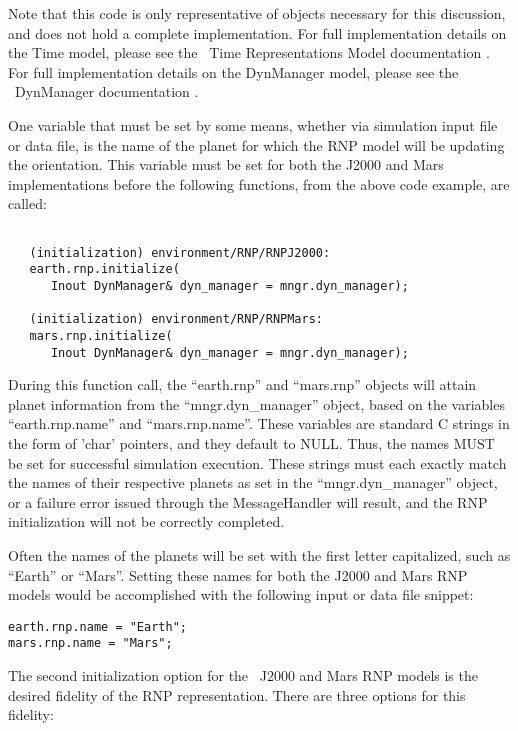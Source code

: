 Note that this code is only representative of objects necessary
for this discussion, and does not hold a complete implementation.
For full implementation details on the Time model, please see
the \JEODid\ Time Representations Model documentation \cite{dynenv:TIME}.
For full implementation details on the DynManager model,
please see the \JEODid\ DynManager documentation
\cite{dynenv:DYNMANAGER}.

One variable that must be set by some means, whether via simulation input
file or data file, is the name of the planet for which the RNP model will be
updating the orientation. This variable must be set for both the J2000 and Mars
implementations before the following functions, from the above code example,
are called:

\begin{verbatim}

   (initialization) environment/RNP/RNPJ2000:
   earth.rnp.initialize(
      Inout DynManager& dyn_manager = mngr.dyn_manager);

   (initialization) environment/RNP/RNPMars:
   mars.rnp.initialize(
      Inout DynManager& dyn_manager = mngr.dyn_manager);

\end{verbatim}

During this function call, the ``earth.rnp'' and ``mars.rnp'' objects will
attain planet information from the \newline ``mngr.dyn\_manager'' object, based
on the variables ``earth.rnp.name'' and ``mars.rnp.name''. These variables are
standard C strings in the form of 'char' pointers, and they default to NULL.
Thus, the names MUST be set for successful simulation execution. These strings
must each exactly match the names of their respective planets as set in the
``mngr.dyn\_manager'' object, or a failure error issued through the
MessageHandler \cite{dynenv:MESSAGE} will result,
and the RNP initialization will not be correctly completed.

Often the names of the planets will be set with the first letter capitalized,
such as ``Earth'' or ``Mars''. Setting these names for both the J2000 and Mars
RNP models would be accomplished with the following input or data file snippet:

\begin{verbatim}
earth.rnp.name = "Earth";
mars.rnp.name = "Mars";
\end{verbatim}

The second initialization option for the \JEODid\ J2000 and Mars RNP models is
the desired fidelity of the RNP representation. There are three options for this
fidelity:


